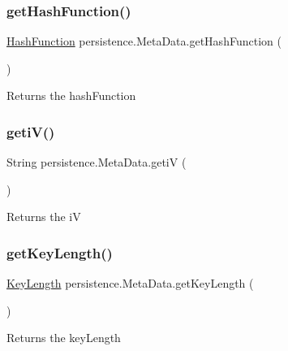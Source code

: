 \subsubsection{\texorpdfstring{get\+Hash\+Function()}{getHashFunction()}}
{\footnotesize\ttfamily \mbox{\hyperlink{enumenums_1_1_hash_function}{Hash\+Function}} persistence.\+Meta\+Data.\+get\+Hash\+Function (\begin{DoxyParamCaption}{ }\end{DoxyParamCaption})}

\begin{DoxyReturn}{Returns}
the hash\+Function 
\end{DoxyReturn}
\mbox{\label{classpersistence_1_1_meta_data_adcde7cd511ae0ee0c28c6127cb92a368}} 
\subsubsection{\texorpdfstring{geti\+V()}{getiV()}}
{\footnotesize\ttfamily String persistence.\+Meta\+Data.\+getiV (\begin{DoxyParamCaption}{ }\end{DoxyParamCaption})}

\begin{DoxyReturn}{Returns}
the iV 
\end{DoxyReturn}
\mbox{\label{classpersistence_1_1_meta_data_a722b4ec15cf49c53bc490fd1d8df8ec5}} 
\subsubsection{\texorpdfstring{get\+Key\+Length()}{getKeyLength()}}
{\footnotesize\ttfamily \mbox{\hyperlink{enumenums_1_1_key_length}{Key\+Length}} persistence.\+Meta\+Data.\+get\+Key\+Length (\begin{DoxyParamCaption}{ }\end{DoxyParamCaption})}

\begin{DoxyReturn}{Returns}
the key\+Length 
\end{DoxyReturn}
\mbox{\label{classpersistence_1_1_meta_data_a061742e63ca7dce02b2a0146b760721e}} 
